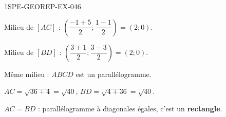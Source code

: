 \begin{corrige}{1SPE-GEOREP-EX-046}

Milieu de $[AC]$ : $\left(\dfrac{-1+5}{2} ; \dfrac{1-1}{2}\right) = (2 ; 0)$.

Milieu de $[BD]$ : $\left(\dfrac{3+1}{2} ; \dfrac{3-3}{2}\right) = (2 ; 0)$.

Même milieu : $ABCD$ est un parallélogramme.

$AC = \sqrt{36 + 4} = \sqrt{40}$, $BD = \sqrt{4 + 36} = \sqrt{40}$.

$AC = BD$ : parallélogramme à diagonales égales, c'est un \textbf{rectangle}.

\end{corrige}
